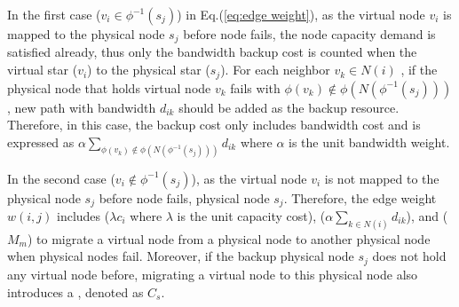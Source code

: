 In the first case (${v_i} \in {\phi ^{ - 1}}({s_j})$) in Eq.(\ref{eq:edge weight}), as the virtual node $v_i$ is mapped to the physical node $s_j$ before node fails, the node capacity demand is satisfied already, thus only the bandwidth backup cost is counted when  the virtual star ($v_i$) to the physical star ($s_j$). For each neighbor $v_k \in N(i)$ , if  the physical node that holds virtual node $v_k$ fails with ${\phi ({v_k}) \notin \phi (N({\phi ^{ - 1}}({s_j})))}$, new path with bandwidth $d_{ik}$ should be added as the backup resource. Therefore, in this case, the backup cost only includes  bandwidth cost and is expressed as $ { \alpha \sum\limits_{\phi ({v_k}) \notin \phi (N({\phi ^{ - 1}}({s_j})))} {{d_{ik}}} }$ where $\alpha$ is the unit bandwidth weight. 

In the second case (${v_i} \notin {\phi ^{ - 1}}({s_j})$), as the virtual node $v_i$ is not mapped to the physical node $s_j$ before node fails,   physical node $s_j$. Therefore, the edge weight $w(i,j)$ includes   ($\lambda {c_i}$ where $\lambda$ is the
unit capacity cost),  ($\alpha \sum\limits_{k \in N(i)} {{d_{ik}}}$), and  (${M_m}$) to migrate a virtual node from a physical node to another physical node when physical nodes fail.   Moreover, if the backup physical node $s_j$ does not  hold any virtual node before, migrating a virtual node to this physical node also introduces a , denoted as $C_s$.


